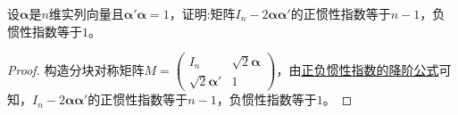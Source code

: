 \documentclass[../../main.tex]{subfiles}
\begin{document}
\begin{proposition}
设\(\boldsymbol{\alpha}\)是\(n\)维实列向量且\(\boldsymbol{\alpha}'\boldsymbol{\alpha}=1\)，证明:矩阵\(I_n - 2\boldsymbol{\alpha}\boldsymbol{\alpha}'\)的正惯性指数等于\(n - 1\)，负惯性指数等于\(1\)。
\end{proposition}
\begin{proof}
构造分块对称矩阵\(M = \begin{pmatrix}
I_n & \sqrt{2}\boldsymbol{\alpha} \\
\sqrt{2}\boldsymbol{\alpha}' & 1
\end{pmatrix}\)，由\hyperref[proposition:正负惯性指数的降阶公式]{正负惯性指数的降阶公式}可知，\(I_n - 2\boldsymbol{\alpha}\boldsymbol{\alpha}'\)的正惯性指数等于\(n - 1\)，负惯性指数等于\(1\)。
\end{proof}
\end{document}
